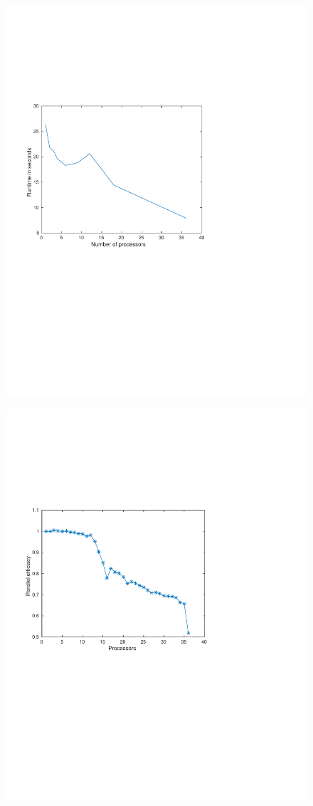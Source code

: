\begin{figure}
\centering
\includegraphics[width=0.7\linewidth]{./figures/runtime}
\caption{}
\label{fig:runtime}
\end{figure}

\begin{figure}
\centering
\includegraphics[width=0.7\linewidth]{./figures/efficiacy}
\caption{}
\label{fig:efficiacy}
\end{figure}
